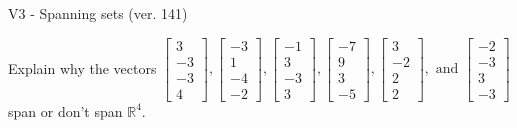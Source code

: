 \begin{exercise}
  \begin{exerciseTitle}V3 - Spanning sets (ver. 141)\end{exerciseTitle}
  \begin{exerciseStatement}
    Explain why the vectors \(\left[\begin{array}{r}
3 \\
-3 \\
-3 \\
4
\end{array}\right] , \left[\begin{array}{r}
-3 \\
1 \\
-4 \\
-2
\end{array}\right] , \left[\begin{array}{r}
-1 \\
3 \\
-3 \\
3
\end{array}\right] , \left[\begin{array}{r}
-7 \\
9 \\
3 \\
-5
\end{array}\right] , \left[\begin{array}{r}
3 \\
-2 \\
2 \\
2
\end{array}\right] , \text{ and } \left[\begin{array}{r}
-2 \\
-3 \\
3 \\
-3
\end{array}\right]\) span or don't span \(\mathbb{R}^4\). 
	



\end{exerciseStatement}
\end{exercise}

